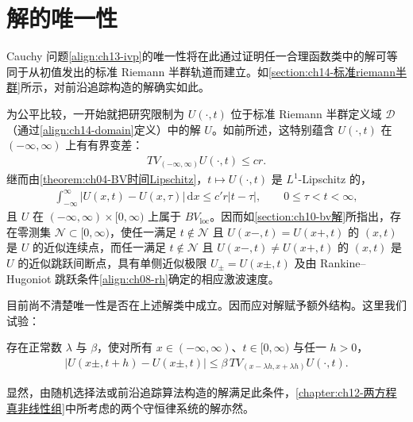 \documentclass[../../main.tex]{subfiles}
\begin{document}
\section{解的唯一性}\label{section:ch14-解的唯一性}

Cauchy 问题\eqref{align:ch13-ivp}的唯一性将在此通过证明任一合理函数类中的解可等同于从初值发出的标准 Riemann 半群轨道而建立。如\cref{section:ch14-标准riemann半群}所示，对前沿追踪构造的解确实如此。



为公平比较，一开始就把研究限制为 $U(\cdot,t)$ 位于标准 Riemann 半群定义域 $\mathscr{D}$（通过\eqref{align:ch14-domain}定义）中的解 $U$。如前所述，这特别蕴含 $U(\cdot,t)$ 在 $(-\infty,\infty)$ 上有有界变差：
\begin{align}
TV_{(-\infty,\infty)}U(\cdot,t)\leqslant cr.
\label{align:ch14-un-TV}
\end{align}
继而由\cref{theorem:ch04-BV时间Lipschitz}，$t\mapsto U(\cdot,t)$ 是 $L^1$-Lipschitz 的，
\begin{align}
\int_{-\infty}^\infty|U(x,t)-U(x,\tau)|\,\mathrm{d}x\leqslant c'r|t-\tau|,\qquad 0\leqslant\tau<t<\infty,
\label{align:ch14-un-lip}
\end{align}
且 $U$ 在 $(-\infty,\infty)\times[0,\infty)$ 上属于 $BV_{\mathrm{loc}}$。因而如\cref{section:ch10-bv解}所指出，存在零测集 $\mathscr{N}\subset[0,\infty)$，使任一满足 $t\notin\mathscr{N}$ 且 $U(x-,t)=U(x+,t)$ 的 $(x,t)$ 是 $U$ 的近似连续点，而任一满足 $t\notin\mathscr{N}$ 且 $U(x-,t)\neq U(x+,t)$ 的 $(x,t)$ 是 $U$ 的近似跳跃间断点，具有单侧近似极限 $U_\pm=U(x\pm,t)$ 及由 Rankine--Hugoniot 跳跃条件\eqref{align:ch08-rh}确定的相应激波速度。



目前尚不清楚唯一性是否在上述解类中成立。因而应对解赋予额外结构。这里我们试验：

\begin{definition}\label{definition:ch14-tame振荡条件}
存在正常数 $\lambda$ 与 $\beta$，使对所有 $x\in(-\infty,\infty)$、$t\in[0,\infty)$ 与任一 $h>0$，
\begin{align}
|U(x\pm,t+h)-U(x\pm,t)|\leqslant\beta\,TV_{(x-\lambda h,x+\lambda h)}U(\cdot,t).
\label{align:ch14-tame}
\end{align}
\end{definition}

显然，由随机选择法或前沿追踪算法构造的解满足此条件，\cref{chapter:ch12-两方程真非线性组}中所考虑的两个守恒律系统的解亦然。
\end{document}
